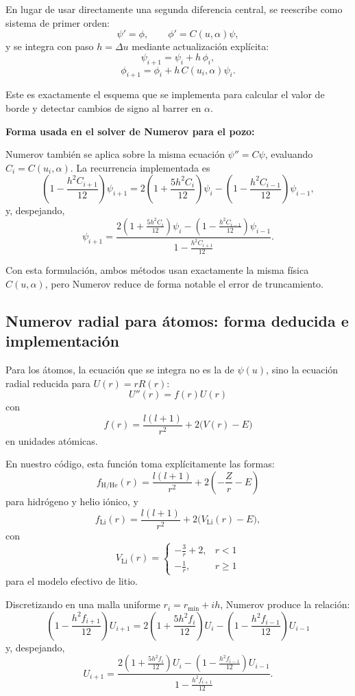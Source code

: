 \documentclass[11pt]{article}
\begin{document}
En lugar de usar directamente una segunda diferencia central, se reescribe como sistema de primer orden:
\[
\psi' = \phi, \qquad \phi' = C(u,\alpha)\psi,
\]
y se integra con paso \(h=\Delta u\) mediante actualización explícita:
\[
\psi_{i+1}=\psi_i+h\,\phi_i,
\]
\[
\phi_{i+1}=\phi_i+h\,C(u_i,\alpha)\psi_i.
\]

Este es exactamente el esquema que se implementa para calcular el valor de borde y detectar cambios de signo al barrer en \(\alpha\).

\textbf{Forma usada en el solver de Numerov para el pozo:}

Numerov también se aplica sobre la misma ecuación \(\psi''=C\psi\), evaluando
\(C_i=C(u_i,\alpha)\). La recurrencia implementada es
\[
\left(1-\frac{h^2C_{i+1}}{12}\right)\psi_{i+1}
=2\left(1+\frac{5h^2C_i}{12}\right)\psi_i
-\left(1-\frac{h^2C_{i-1}}{12}\right)\psi_{i-1},
\]
y, despejando,
\[
\psi_{i+1}=
\frac{2\left(1+\frac{5h^2C_i}{12}\right)\psi_i
-\left(1-\frac{h^2C_{i-1}}{12}\right)\psi_{i-1}}
{1-\frac{h^2C_{i+1}}{12}}.
\]

Con esta formulación, ambos métodos usan exactamente la misma física \(C(u,\alpha)\), pero Numerov reduce de forma notable el error de truncamiento.

\subsection{Numerov radial para átomos: forma deducida e implementación}
Para los átomos, la ecuación que se integra no es la de \(\psi(u)\), sino la ecuación radial reducida para
\(U(r)=rR(r)\):
\[
U''(r)=f(r)U(r)
\]
con
\[
f(r)=\frac{l(l+1)}{r^2}+2\big(V(r)-E\big)
\]
en unidades atómicas.

En nuestro código, esta función toma explícitamente las formas:
\[
f_{\text{H/He}}(r)=\frac{l(l+1)}{r^2}+2\left(-\frac{Z}{r}-E\right)
\]
para hidrógeno y helio iónico, y
\[
f_{\text{Li}}(r)=\frac{l(l+1)}{r^2}+2\big(V_{\text{Li}}(r)-E\big),
\]
con
\[
V_{\text{Li}}(r)=
\begin{cases}
-\frac{3}{r}+2, & r<1 \\
-\frac{1}{r}, & r\ge 1
\end{cases}
\]
para el modelo efectivo de litio.

Discretizando en una malla uniforme \(r_i=r_{\min}+ih\), Numerov produce la relación:
\[
\left(1-\frac{h^2 f_{i+1}}{12}\right)U_{i+1}
=2\left(1+\frac{5h^2 f_i}{12}\right)U_i
-\left(1-\frac{h^2 f_{i-1}}{12}\right)U_{i-1}
\]
y, despejando,
\[
U_{i+1}=
\frac{2\left(1+\frac{5h^2 f_i}{12}\right)U_i
-\left(1-\frac{h^2 f_{i-1}}{12}\right)U_{i-1}}
{1-\frac{h^2 f_{i+1}}{12}}.
\]
\end{document}
